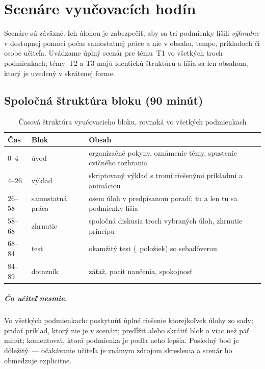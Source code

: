 \chapter{Scenáre vyučovacích hodín}
\label{chapter:lekcie}

Scenáre sú záväzné. Ich úlohou je zabezpečiť, aby sa tri podmienky líšili \emph{výhradne} v dostupnej pomoci počas samostatnej práce a nie v obsahu, tempe, príkladoch či osobe učiteľa. Uvádzame úplný scenár pre tému~T1 vo všetkých troch podmienkach; témy~T2 a T3 majú identickú štruktúru a líšia sa len obsahom, ktorý je uvedený v skrátenej forme.

\section{Spoločná štruktúra bloku (90 minút)}

\begin{table}[H]
\centering
\caption{Časová štruktúra vyučovacieho bloku, rovnaká vo všetkých podmienkach}
\label{tab:struktura}
\small
\begin{tabularx}{\textwidth}{@{}l l X@{}}
\toprule
\textbf{Čas} & \textbf{Blok} & \textbf{Obsah} \\
\midrule
0--4    & úvod            & organizačné pokyny, oznámenie témy, spustenie cvičného rozhrania \\
4--26   & výklad          & skriptovaný výklad s tromi riešenými príkladmi a animáciou \\
26--58  & samostatná práca& osem úloh v predpísanom poradí; tu a len tu sa podmienky líšia \\
58--68  & zhrnutie        & spoločná diskusia troch vybraných úloh, zhrnutie princípu \\
68--84  & test            & okamžitý test (\asmFormItems{}~položiek) so sebadôverou \\
84--89  & dotazník        & záťaž, pocit naučenia, spokojnosť \\
\bottomrule
\end{tabularx}
\end{table}

\paragraph{Čo učiteľ nesmie.} Vo všetkých podmienkach: poskytnúť úplné riešenie ktorejkoľvek úlohy zo sady; pridať príklad, ktorý nie je v scenári; predĺžiť alebo skrátiť blok o viac než päť minút; komentovať, ktorá podmienka je podľa neho lepšia. Posledný bod je dôležitý~--- očakávanie učiteľa je známym zdrojom skreslenia a scenár ho obmedzuje explicitne.

